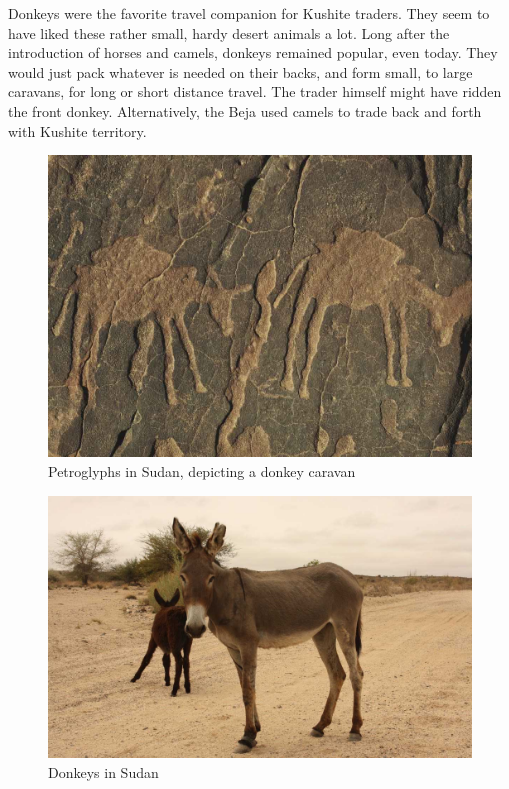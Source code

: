 \documentclass[a4paper,12pt]{scrreprt}
\begin{document}
Donkeys were the favorite travel companion for Kushite traders. They seem to have liked these rather small, hardy desert animals a lot. Long after the introduction of horses and camels, donkeys remained popular, even today. They would just pack whatever is needed on their backs, and form small, to large caravans, for long or short distance travel. The trader himself might have ridden the front donkey. Alternatively, the Beja used camels to trade back and forth with Kushite territory.

\begin{figure}[H]
	\centering
	\includegraphics[width=\textwidth]{img/trader_land/petroglyphs_donkey_caravan}
	\caption{Petroglyphs in Sudan, depicting a donkey caravan}
\end{figure}

\begin{figure}[H]
	\centering
	\includegraphics[width=\textwidth]{img/trader_land/donkey_sudan}
	\caption{Donkeys in Sudan}
\end{figure}
\end{document}
